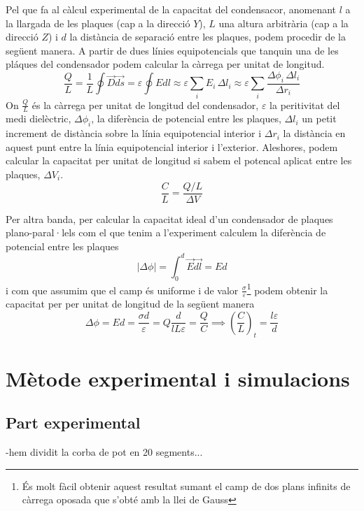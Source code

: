 \documentclass[11pt]{article}
\begin{document}
Pel que fa al càlcul experimental de la capacitat del condensacor, anomenant $l$ a la llargada de les plaques (cap a la direcció $Y$), $L$ una altura arbitrària (cap a la direcció $Z$) i $d$ la distància de separació entre les plaques, podem procedir de la següent manera.
A partir de dues línies equipotencials que tanquin una de les pláques del condensador podem calcular la càrrega per unitat de longitud.
\begin{equation}
    \frac{Q}{L} = \frac{1}{L}\oint\vec{D}\vec{ds}=\varepsilon\oint Edl\approx \varepsilon \sum_i E_i \, \Delta l_i \approx \varepsilon \sum_i \frac{\Delta \phi_i \, \Delta l_i}{\Delta r_i}
    \label{eq: Q}
\end{equation}
On $\frac{Q }{L }$ és la càrrega per unitat de longitud del condensador, $\varepsilon$ la peritivitat del medi dielèctric, $\Delta \phi_i$, la diferència de potencial entre les plaques, $\Delta l_i$ un petit increment de distància sobre la línia equipotencial interior i $\Delta r_i$ la distància en aquest punt entre la línia equipotencial interior i l'exterior.
Aleshores, podem calcular la capacitat per unitat de longitud si sabem el potencal aplicat entre les plaques, $\Delta V_i$.
\begin{equation}
    \frac{C}{L}=\frac{Q/L}{\Delta V}
    \label{eq: C}
\end{equation}


Per altra banda, per calcular la capacitat ideal d'un condensador de plaques plano-paral·lels com el que tenim a l'experiment calculem la diferència de potencial entre les plaques 
\begin{equation}
    |\Delta\phi|=\int_{0}^{d} \vec{E}\vec{dl}= Ed
\end{equation}
i com que assumim que el camp és uniforme i de valor $\frac{\sigma}{\varepsilon}$\footnote{És molt fàcil obtenir aquest resultat sumant el camp de dos plans infinits de càrrega oposada que s'obté amb la llei de Gauss} podem obtenir la capacitat per per unitat de longitud de la següent manera
\begin{equation}
    \Delta\phi=Ed=\frac{\sigma d}{\varepsilon}
    =Q\frac{d}{lL\varepsilon}=\frac{Q}{C}\implies (\frac{C}{L})_t=\frac{l\varepsilon}{d}
    \label{eq: c_t}
\end{equation}
\section{Mètode experimental i simulacions}\label{sec: metode}
\subsection{Part experimental}
-hem dividit la corba de pot en 20 segments...
\end{document}
